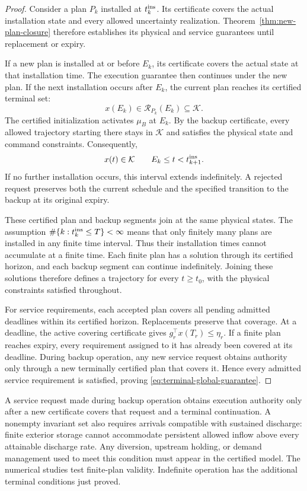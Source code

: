 \documentclass[preprint,12pt]{elsarticle}
\begin{document}
\begin{proof}
Consider a plan $P_k$ installed at $t_k^{\rm ins}$. Its certificate
covers the actual installation state and every allowed uncertainty
realization. Theorem~\ref{thm:new-plan-closure} therefore establishes its
physical and service guarantees until replacement or expiry.

If a new plan is installed at or before $E_k$, its certificate covers the
actual state at that installation time. The execution guarantee then
continues under the new plan. If the next installation occurs after
$E_k$, the current plan reaches its certified terminal set:
\[
 x(E_k)\in\mathcal R_{P_k}(E_k)\subseteq\mathcal K.
\]
The certified initialization activates $\mu_B$ at $E_k$. By the backup
certificate, every allowed trajectory starting there stays in
$\mathcal K$ and satisfies the physical state and command constraints.
Consequently,
\[
 x(t)\in\mathcal K
 \qquad E_k\le t<t_{k+1}^{\rm ins}.
\]
If no further installation occurs, this interval extends indefinitely.
A rejected request preserves both the current schedule and the specified
transition to the backup at its original expiry.

These certified plan and backup segments join at the same physical
states. The assumption
$\#\{k:t_k^{\rm ins}\le T\}<\infty$ means that only finitely many plans
are installed in any finite time interval. Thus their installation times
cannot accumulate at a finite time. Each finite plan has a solution
through its certified horizon, and each backup segment can continue
indefinitely. Joining these solutions therefore defines a trajectory for
every $t\ge t_0$, with the physical constraints satisfied throughout.

For service requirements, each accepted plan covers all pending admitted
deadlines within its certified horizon. Replacements preserve that
coverage. At a deadline, the active covering certificate gives
$g_r^\top x(T_r)\le\eta_r$. If a finite plan reaches expiry, every
requirement assigned to it has already been covered at its deadline.
During backup operation, any new service request obtains authority only
through a new terminally certified plan that covers it. Hence every
admitted service requirement is satisfied, proving
\eqref{eq:terminal-global-guarantee}.
\end{proof}

A service request made during backup operation obtains execution authority
only after a new certificate covers that request and a terminal
continuation. A nonempty invariant set also requires arrivals compatible
with sustained discharge: finite exterior storage cannot accommodate
persistent allowed inflow above every attainable discharge rate. Any
diversion, upstream holding, or demand management used to meet this
condition must appear in the certified model. The numerical studies test
finite-plan validity. Indefinite operation has the additional terminal
conditions just proved.
\end{document}
